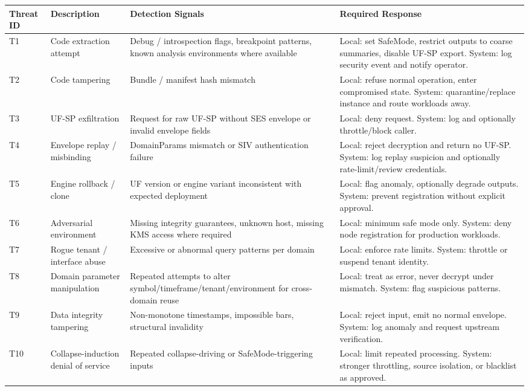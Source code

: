 \renewcommand{\arraystretch}{1.15}
\begin{longtable}{p{}p{}p{}p{}}
\toprule
Threat ID & Description & Detection Signals & Required Response \\
\midrule
T1 & Code extraction attempt & Debug / introspection flags, breakpoint patterns, known analysis environments where available & Local: set SafeMode, restrict outputs to coarse summaries, disable UF-SP export. System: log security event and notify operator. \\
T2 & Code tampering & Bundle / manifest hash mismatch & Local: refuse normal operation, enter compromised state. System: quarantine/replace instance and route workloads away. \\
T3 & UF-SP exfiltration & Request for raw UF-SP without SES envelope or invalid envelope fields & Local: deny request. System: log and optionally throttle/block caller. \\
T4 & Envelope replay / misbinding & DomainParams mismatch or SIV authentication failure & Local: reject decryption and return no UF-SP. System: log replay suspicion and optionally rate-limit/review credentials. \\
T5 & Engine rollback / clone & UF version or engine variant inconsistent with expected deployment & Local: flag anomaly, optionally degrade outputs. System: prevent registration without explicit approval. \\
T6 & Adversarial environment & Missing integrity guarantees, unknown host, missing KMS access where required & Local: minimum safe mode only. System: deny node registration for production workloads. \\
T7 & Rogue tenant / interface abuse & Excessive or abnormal query patterns per domain & Local: enforce rate limits. System: throttle or suspend tenant identity. \\
T8 & Domain parameter manipulation & Repeated attempts to alter symbol/timeframe/tenant/environment for cross-domain reuse & Local: treat as error, never decrypt under mismatch. System: flag suspicious patterns. \\
T9 & Data integrity tampering & Non-monotone timestamps, impossible bars, structural invalidity & Local: reject input, emit no normal envelope. System: log anomaly and request upstream verification. \\
T10 & Collapse-induction denial of service & Repeated collapse-driving or SafeMode-triggering inputs & Local: limit repeated processing. System: stronger throttling, source isolation, or blacklist as approved. \\
\bottomrule
\end{longtable}

